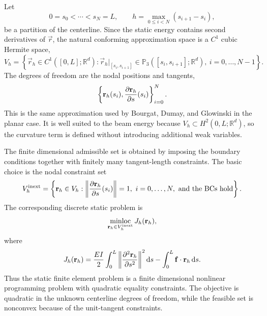 Let
\begin{equation*}
    0 = s_0 < \cdots < s_N = L,
    \qquad
    h = \max_{0 \leq i < N}(s_{i+1}-s_i),
\end{equation*}
be a partition of the centerline. Since the static energy contains second
derivatives of \(\vec r\), the natural conforming approximation space is a
\(C^1\) cubic Hermite space,
\begin{equation}\label{eq:addm-hermite-space}
    V_h =
    \left\{
    \vec r_h \in C^1([0,L];\mathbb{R}^d)
    :
    \vec r_h|_{[s_i,s_{i+1}]}
    \in \mathbb{P}_3([s_i,s_{i+1}];\mathbb{R}^d),
    \ i=0,\ldots,N-1
    \right\}.
\end{equation}
The degrees of freedom are the nodal positions and tangents,
\begin{equation*}
    \left\{
    \mathbf{r}_h(s_i),
    \pdv{\mathbf{r}_h}{s}(s_i)
    \right\}_{i=0}^N.
\end{equation*}
This is the same approximation used by Bourgat, Dumay, and Glowinski in the
planar case. It is well suited to the beam energy because
\(V_h \subset H^2(0,L;\mathbb{R}^d)\), so the curvature term is defined without
introducing additional weak variables.

The finite dimensional admissible set is obtained by imposing the boundary
conditions together with finitely many tangent-length constraints. The basic
choice is the nodal constraint set
\begin{equation}\label{eq:addm-discrete-admissible-set}
    V_h^{\mathrm{inext}}
    =
    \left\{
    \mathbf{r}_h \in V_h
    :
    \left\lVert \pdv{\mathbf{r}_h}{s}(s_i) \right\rVert = 1,
    \ i=0,\ldots,N,
    \ \text{and the BCs hold}
    \right\}.
\end{equation}
The corresponding discrete static problem is
\begin{equation}\label{eq:addm-discrete-static-problem}
    \operatorname*{minloc}_{\mathbf{r}_h \in V_h^{\mathrm{inext}}}
    J_h(\mathbf{r}_h),
\end{equation}
where
\begin{equation}\label{eq:addm-discrete-static-energy}
    J_h(\vec r_h)
    =
    \frac{EI}{2}
    \int_0^L \norm{\pdv[2]{\vec r_h}{s}}^2 \odif{s}
    -
    \int_0^L \vec f \cdot \vec r_h \odif{s}.
\end{equation}
Thus the static finite element problem is a finite dimensional nonlinear
programming problem with quadratic equality constraints. The objective is
quadratic in the unknown centerline degrees of freedom, while the feasible set
is nonconvex because of the unit-tangent constraints.

